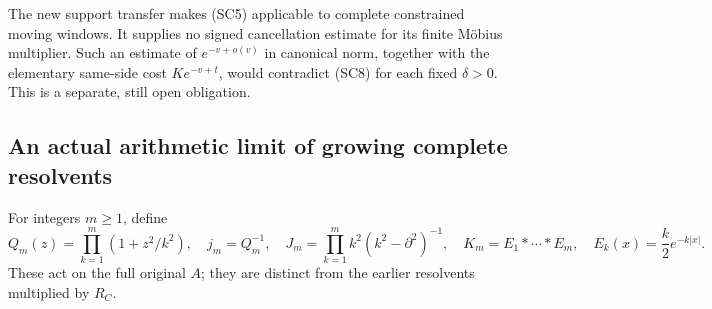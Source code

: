 \documentclass[11pt]{article}
\theoremstyle{remark}\newtheorem{remark}[theorem]{Remark}
\begin{document}
The new support transfer makes (SC5) applicable to complete
constrained moving windows. It supplies no signed cancellation
estimate for its finite Möbius multiplier. Such an estimate of
\(e^{-v+o(v)}\) in canonical norm, together with the elementary
same-side cost \(Ke^{-v+t}\), would contradict (SC8) for each
fixed \(\delta>0\). This is a separate, still open obligation.

\subsection{An actual arithmetic limit of growing complete resolvents}
\label{sec:growing-resolvents}

For integers \(m\ge1\), define
\[
 Q_m(z)=\prod_{k=1}^m(1+z^2/k^2),\quad j_m=Q_m^{-1},\quad
 J_m=\prod_{k=1}^m k^2(k^2-\partial^2)^{-1},\quad
 K_m=E_1*\cdots*E_m,\quad E_k(x)=\frac{k}{2}e^{-k|x|}.
                                                               \tag{GL1}
\]
These act on the full original \(A\); they are distinct from
the earlier resolvents multiplied by \(R_C\).
\end{document}
